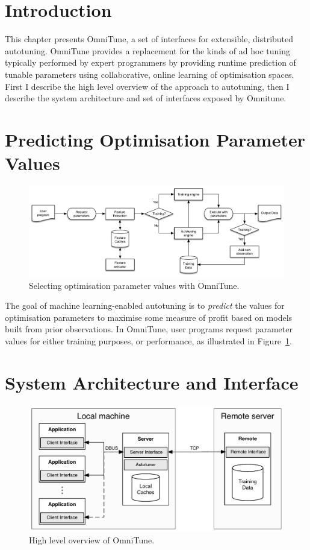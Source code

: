 \section{Introduction}

This chapter presents OmniTune, a set of interfaces for extensible,
distributed autotuning. OmniTune provides a replacement for the kinds
of ad hoc tuning typically performed by expert programmers by
providing runtime prediction of tunable parameters using
collaborative, online learning of optimisation spaces. First I
describe the high level overview of the approach to autotuning, then I
describe the system architecture and set of interfaces exposed by
Omnitune.


\section{Predicting Optimisation Parameter Values}

\begin{figure}[b]
\centering
\includegraphics[width=\textwidth]{img/omnitune-system-flow.pdf}
\caption{%
  Selecting optimisation parameter values with OmniTune.%
}
\label{fig:omnitune-system-flow}
\end{figure}

The goal of machine learning-enabled autotuning is to \emph{predict}
the values for optimisation parameters to maximise some measure of
profit based on models built from prior observations. In OmniTune,
user programs request parameter values for either training purposes,
or performance, as illustrated in
Figure~\ref{fig:omnitune-system-flow}.


\section{System Architecture and Interface}

\begin{figure}
\centering
\includegraphics[width=.9\textwidth]{img/omnitune-system-overview.pdf}
\caption{%
  High level overview of OmniTune.%
}
\label{fig:omnitune-system-overview}
\end{figure}

